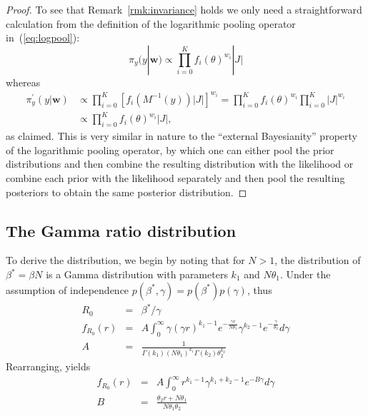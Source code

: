 \documentclass[11pt]{article}
\begin{document}
\begin{proof}
To see that Remark~\ref{rmk:invariance} holds we only need a straightforward calculation from the definition of the logarithmic pooling operator in~(\ref{eq:logpool}):
\[\pi_{y}(y |\mathbf{w}) \propto \prod_{i=0}^K f_i(\theta)^{w_i}|J| \]
whereas
\begin{align*}
 \pi^{\prime}_{y}(y|\mathbf{w}) &\propto  \prod_{i=0}^K \left[ f_i(M^{-1}(y))|J| \right] ^{w_i} = \prod_{i=0}^K f_i(\theta)^{w_i} \prod_{i=0}^K|J|^{w_i}\\
 &\propto  \prod_{i=0}^K f_i(\theta)^{w_i}|J|,
\end{align*}
as claimed.
This is very similar in nature to the ``external Bayesianity'' property of the logarithmic pooling operator, by which one can either pool the prior distributions and then combine the resulting distribution with the likelihood or combine each prior with the likelihood separately and then pool the resulting posteriors to obtain the same posterior distribution.
\end{proof}


\subsection{The Gamma ratio distribution}

To derive the distribution, we begin by noting that for $N > 1$, the distribution of $\beta^{\ast} = \beta N$ is a Gamma distribution with parameters $k_1$ and $N\theta_1$.
Under the assumption of independence $p(\beta^{\ast}, \gamma) = p(\beta^{\ast})p(\gamma)$, thus
\begin{eqnarray}
R_0 &=& \beta^{\ast}/\gamma\\
f_{R_0}(r) &=& A \int_{0}^{\infty} \gamma(\gamma r)^{k_1 -1} e^{-\frac{\gamma r}{N\theta_1}} \gamma^{k_2 -1} e^{-\frac{\gamma}{\theta_2}} d\gamma \\
A &=& \frac{1}{\Gamma(k_1)(N\theta_1)^{k_1}\Gamma(k_2)\theta_2^{k_2}}
\end{eqnarray}
Rearranging, yields
\begin{eqnarray}
\label{eq:toint}
f_{R_0}(r) &=& A \int_{0}^{\infty} r^{k_1 -1} \gamma^{k_1 + k_2 -1} e^{-B\gamma} d\gamma \\
        B  &=& \frac{\theta_2 r + N\theta_1}{N\theta_1\theta_2}
\end{eqnarray}
\end{document}
